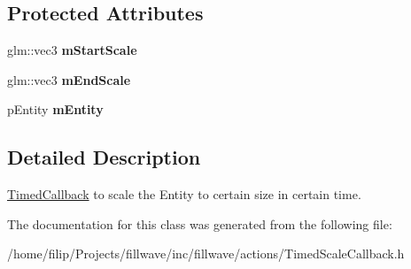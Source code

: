\subsection*{Protected Attributes}
\begin{DoxyCompactItemize}
\item 
\hypertarget{classfillwave_1_1actions_1_1TimedScaleCallback_ab41662e354822f21bd99f736d6cca6a7}{}glm\+::vec3 {\bfseries m\+Start\+Scale}\label{classfillwave_1_1actions_1_1TimedScaleCallback_ab41662e354822f21bd99f736d6cca6a7}

\item 
\hypertarget{classfillwave_1_1actions_1_1TimedScaleCallback_ac989ce62e6b1e16936b3581c3c91334f}{}glm\+::vec3 {\bfseries m\+End\+Scale}\label{classfillwave_1_1actions_1_1TimedScaleCallback_ac989ce62e6b1e16936b3581c3c91334f}

\item 
\hypertarget{classfillwave_1_1actions_1_1TimedScaleCallback_ab63f837dd6c60c617898e36776d7f5a3}{}p\+Entity {\bfseries m\+Entity}\label{classfillwave_1_1actions_1_1TimedScaleCallback_ab63f837dd6c60c617898e36776d7f5a3}

\end{DoxyCompactItemize}


\subsection{Detailed Description}
\hyperlink{classfillwave_1_1actions_1_1TimedCallback}{Timed\+Callback} to scale the Entity to certain size in certain time. 

The documentation for this class was generated from the following file\+:\begin{DoxyCompactItemize}
\item 
/home/filip/\+Projects/fillwave/inc/fillwave/actions/Timed\+Scale\+Callback.\+h\end{DoxyCompactItemize}
